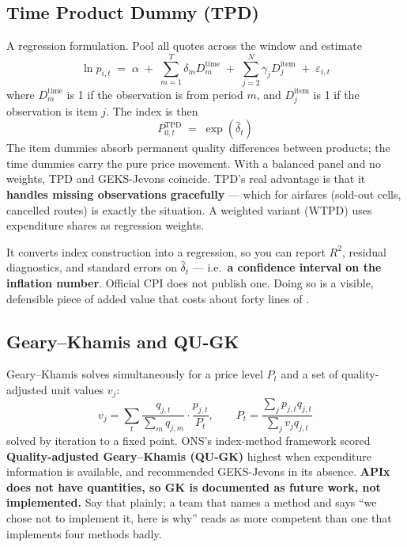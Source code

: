 \subsection{Time Product Dummy (TPD)}

A regression formulation. Pool all quotes across the window and estimate
\begin{equation}
\boxed{\;\ln p_{i,t} \;=\; \alpha \;+\; \sum_{m=1}^{T}\delta_m D^{\text{time}}_m
\;+\; \sum_{j=2}^{N}\gamma_j D^{\text{item}}_j \;+\; \varepsilon_{i,t}\;}
\end{equation}
where $D^{\text{time}}_m$ is 1 if the observation is from period $m$, and
$D^{\text{item}}_j$ is 1 if the observation is item $j$. The index is then
\begin{equation}
P^{\text{TPD}}_{0,t} \;=\; \exp(\hat\delta_t)
\end{equation}
The item dummies absorb permanent quality differences between products; the time dummies
carry the pure price movement. With a balanced panel and no weights, TPD and GEKS-Jevons
coincide. TPD's real advantage is that it \textbf{handles missing observations gracefully}
--- which for airfares (sold-out cells, cancelled routes) is exactly the situation. A
weighted variant (WTPD) uses expenditure shares as regression weights.

\begin{keybox}
 It converts index construction into a regression, so you
can report $R^2$, residual diagnostics, and standard errors on $\hat\delta_t$ --- i.e.\
\textbf{a confidence interval on the inflation number}. Official CPI does not publish one.
Doing so is a visible, defensible piece of added value that costs about forty lines of
\code{statsmodels}.
\end{keybox}

\subsection{Geary--Khamis and QU-GK}

Geary--Khamis solves simultaneously for a price level $P_t$ and a set of quality-adjusted
unit values $v_j$:
\begin{equation}
v_j = \sum_t \frac{q_{j,t}}{\sum_m q_{j,m}}\cdot\frac{p_{j,t}}{P_t},
\qquad
P_t = \frac{\sum_j p_{j,t}q_{j,t}}{\sum_j v_j q_{j,t}}
\end{equation}
solved by iteration to a fixed point. ONS's index-method framework scored
\textbf{Quality-adjusted Geary--Khamis (QU-GK)} highest when expenditure information is
available, and recommended GEKS-Jevons in its absence. \textbf{APIx does not have
quantities, so GK is documented as future work, not implemented.} Say that plainly; a team
that names a method and says ``we chose not to implement it, here is why'' reads as more
competent than one that implements four methods badly.

